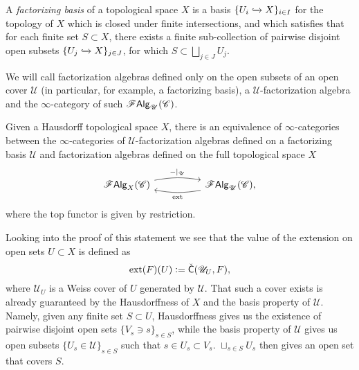 \documentclass[../text]{subfiles}
\begin{document}
\begin{definition}
    A \emph{factorizing basis} of a topological space $X$ is a basis $\{ U_i \xhookrightarrow{} X\}_{i \in I}$ for the topology of $X$ which is closed under finite intersections, and which satisfies that for each finite set $S \subset X$, there exists a finite sub-collection of pairwise disjoint open subsets $\{ U_j \xhookrightarrow{} X\}_{j \in J}$, for which $S \subset \bigsqcup_{j \in J} U_j$.
\end{definition}

\begin{definition}
    We will call factorization algebras defined only on the open subsets of an open cover $\mathscr{U}$ (in particular, for example, a factorizing basis), a $\mathscr{U}$-factorization algebra and the $\infty$-category of such $\mathscr{F} \mathsf{Alg}_{\mathscr{U}}(\mathscr{C})$.
\end{definition}

\begin{theorem}[\cite{cg2016}]\label{thm:fa_from_basis}
    Given a Hausdorff topological space $X$, there is an equivalence of $\infty$-categories between the $\infty$-categories of $\mathscr{U}$-factorization algebras defined on a factorizing basis $\mathscr{U}$ and factorization algebras defined on the full topological space $X$
    \begin{equation}
        \begin{tikzcd}
            \falg_X(\catC) \arrow[rr, bend left=10, "\mathrm{-|_{\mathscr{U}}}"] &  & \falg_{\mathscr{U}}(\catC) \arrow[ll, bend left=10, "\mathrm{ext}"],
        \end{tikzcd}
    \end{equation}
    where the top functor is given by restriction.
\end{theorem}

\begin{remark}
    Looking into the proof of this statement we see that the value of the extension on open sets $U \subset X$ is defined as
    \begin{equation}
        \mathrm{ext}(F)(U) := \check{\mathsf{C}}(\mathscr{U}_U, F),
    \end{equation}
    where $\mathscr{U}_U$ is a Weiss cover of $U$ generated by $\mathscr{U}$. That such a cover exists is already guaranteed by the Hausdorffness of $X$ and the basis property of $\mathscr{U}$. Namely, given any finite set $S \subset U$, Hausdorffness gives us the existence of pairwise disjoint open sets $\{ V_s \ni s\}_{s \in S}$, while the basis property of $\mathscr{U}$ gives us open subsets $\{ U_s \in \mathscr{U} \}_{s \in S}$ such that $s \in U_s \subset V_s$. $\sqcup_{s \in S} U_s$ then gives an open set that covers $S$.
\end{remark}
\end{document}
